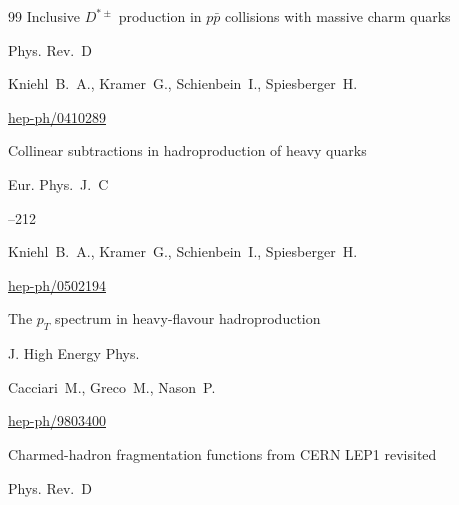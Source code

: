 \begin{thebibliography}{99}
\paper Inclusive $D^{*\pm}$ production in $p\bar p$ collisions with massive charm quarks


\jour Phys. Rev.~D 



\by Kniehl~B.~A., Kramer~G., Schienbein~I., Spiesberger~H. 



\arxiv \href{http://arxiv.org/abs/hep-ph/0410289}{hep-ph/0410289}




\paper Collinear subtractions in hadroproduction of heavy quarks


\jour Eur. Phys.~J.~C 



--212

\by Kniehl~B.~A., Kramer~G., Schienbein~I., Spiesberger~H. 


\arxiv \href{http://arxiv.org/abs/hep-ph/0502194}{hep-ph/0502194}






\paper The $p_T$ spectrum in heavy-flavour hadroproduction

\jour J. High Energy Phys.





\by Cacciari~M., Greco~M., Nason~P.


\arxiv  \href{http://arxiv.org/abs/hep-ph/9803400}{hep-ph/9803400}






\paper Charmed-hadron fragmentation functions from CERN LEP1 revisited


\jour Phys. Rev.~D 


\end{thebibliography}
